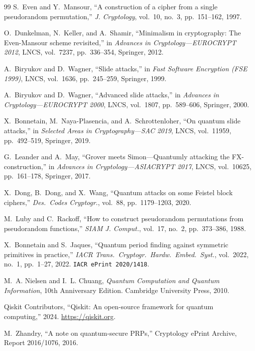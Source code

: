 \documentclass[11pt,a4paper]{article}
\begin{document}
\begin{thebibliography}{99}
S.~Even and Y.~Mansour,
``A construction of a cipher from a single pseudorandom permutation,''
\textit{J. Cryptology}, vol.~10, no.~3, pp.~151--162, 1997.

O.~Dunkelman, N.~Keller, and A.~Shamir,
``Minimalism in cryptography: The Even-Mansour scheme revisited,''
in \textit{Advances in Cryptology---EUROCRYPT 2012},
LNCS, vol.~7237, pp.~336--354, Springer, 2012.

A.~Biryukov and D.~Wagner,
``Slide attacks,''
in \textit{Fast Software Encryption (FSE 1999)},
LNCS, vol.~1636, pp.~245--259, Springer, 1999.

A.~Biryukov and D.~Wagner,
``Advanced slide attacks,''
in \textit{Advances in Cryptology---EUROCRYPT 2000},
LNCS, vol.~1807, pp.~589--606, Springer, 2000.

X.~Bonnetain, M.~Naya-Plasencia, and A.~Schrottenloher,
``On quantum slide attacks,''
in \textit{Selected Areas in Cryptography---SAC 2019},
LNCS, vol.~11959, pp.~492--519, Springer, 2019.

G.~Leander and A.~May,
``Grover meets Simon---Quantumly attacking the FX-construction,''
in \textit{Advances in Cryptology---ASIACRYPT 2017},
LNCS, vol.~10625, pp.~161--178, Springer, 2017.

X.~Dong, B.~Dong, and X.~Wang,
``Quantum attacks on some Feistel block ciphers,''
\textit{Des.\ Codes Cryptogr.}, vol.~88, pp.~1179--1203, 2020.

M.~Luby and C.~Rackoff,
``How to construct pseudorandom permutations from pseudorandom
functions,''
\textit{SIAM J. Comput.}, vol.~17, no.~2, pp.~373--386, 1988.

X.~Bonnetain and S.~Jaques,
``Quantum period finding against symmetric primitives in practice,''
\textit{IACR Trans.\ Cryptogr.\ Hardw.\ Embed.\ Syst.}, vol.~2022,
no.~1, pp.~1--27, 2022.
\texttt{IACR ePrint 2020/1418}.

M.~A. Nielsen and I.~L. Chuang,
\textit{Quantum Computation and Quantum Information},
10th Anniversary Edition.
Cambridge University Press, 2010.

Qiskit Contributors,
``Qiskit: An open-source framework for quantum computing,'' 2024.
\url{https://qiskit.org}.

M.~Zhandry,
``A note on quantum-secure PRPs,''
Cryptology ePrint Archive, Report 2016/1076, 2016.

\end{thebibliography}
\end{document}
